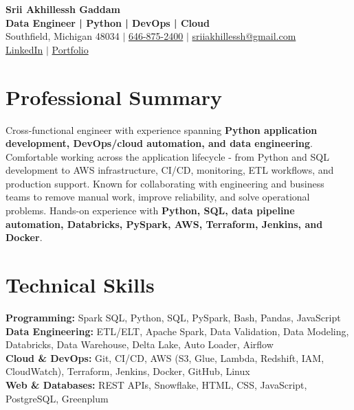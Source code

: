 \documentclass[letterpaper,10pt]{article}
\begin{document}
\fontsize{9.35pt}{10.45pt}\selectfont

\begin{center}
    {\LARGE \textbf{Srii Akhillessh Gaddam}} \\[-1pt]
    \textbf{Data Engineer | Python | DevOps | Cloud} \\[2pt]
    Southfield, Michigan 48034 $|$
    \href{tel:6468752400}{646-875-2400} $|$
    \href{mailto:sriiakhillessh@gmail.com}{sriiakhillessh@gmail.com} \\[1pt]
    \href{https://www.linkedin.com/in/srii-akhiilessh-gaddam-b48668191/}{LinkedIn} $|$
    \href{https://sriiakhillesshg.github.io/portfolio/}{Portfolio}
\end{center}
\vspace{-8pt}

\section{Professional Summary}
\small{Cross-functional engineer with experience spanning \textbf{Python application development, DevOps/cloud automation, and data engineering}. Comfortable working across the application lifecycle - from Python and SQL development to AWS infrastructure, CI/CD, monitoring, ETL workflows, and production support. Known for collaborating with engineering and business teams to remove manual work, improve reliability, and solve operational problems. Hands-on experience with \textbf{Python, SQL, data pipeline automation, Databricks, PySpark, AWS, Terraform, Jenkins, and Docker}.}

\section{Technical Skills}
\small{
\textbf{Programming:} Spark SQL, Python, SQL, PySpark, Bash, Pandas, JavaScript \\
\textbf{Data Engineering:} ETL/ELT, Apache Spark, Data Validation, Data Modeling, Databricks, Data Warehouse, Delta Lake, Auto Loader, Airflow \\
\textbf{Cloud \& DevOps:} Git, CI/CD, AWS (S3, Glue, Lambda, Redshift, IAM, CloudWatch), Terraform, Jenkins, Docker, GitHub, Linux \\
\textbf{Web \& Databases:} REST APIs, Snowflake, HTML, CSS, JavaScript, PostgreSQL, Greenplum
}
\end{document}
